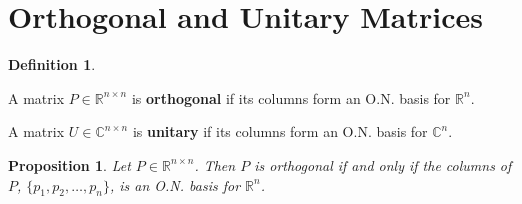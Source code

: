 \documentclass[12pt]{article}
\newtheorem*{proposition}{Proposition}
\theoremstyle{definition}
\newtheorem*{definition}{Definition}
\begin{document}
\section{Orthogonal and Unitary Matrices}

\begin{definition} $ $

A matrix $P \in \mathbb{R}^{n \times n}$ is \textbf{orthogonal} if its columns form an O.N.
basis for $\mathbb{R}^n$.

A matrix $U \in \mathbb{C}^{n \times n}$ is \textbf{unitary} if its columns form an O.N.
basis for $\mathbb{C}^n$.
\end{definition}

\begin{proposition}
Let $P \in \mathbb{R}^{n \times n}$. Then $P$ is orthogonal if and only if the columns of $P$,
$\{p_1, p_2, \ldots, p_n\}$, is an O.N. basis for $\mathbb{R}^n$.
\end{proposition}
\end{document}
